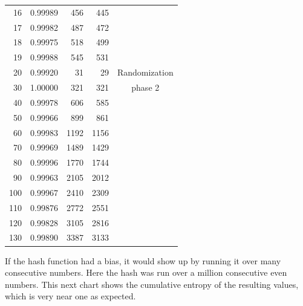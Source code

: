 \documentclass[letterpaper]{article}
\begin{document}
\begin{multicols}{2}
\begin{minipage}{\columnwidth}
\begin{tabular}{|r|r|r|r|c|}
            16                 & 0.99989          & 456           & 445            &                \\
            17                 & 0.99982          & 487           & 472            &                \\
            18                 & 0.99975          & 518           & 499            &                \\
            19                 & 0.99988          & 545           & 531            &                \\
            \hline
            20                 & 0.99920          & 31            & 29             & Randomization       \\
            30                 & 1.00000          & 321           & 321            & phase 2      \\
            40                 & 0.99978          & 606           & 585            &        \\
            50                 & 0.99966          & 899           & 861            &                \\
            60                 & 0.99983          & 1192          & 1156           &                \\
            70                 & 0.99969          & 1489          & 1429           &                \\
            80                 & 0.99996          & 1770          & 1744           &                \\
            90                 & 0.99963          & 2105          & 2012           &                \\
            100                & 0.99967          & 2410          & 2309           &                \\
            110                & 0.99876          & 2772          & 2551           &                \\
            120                & 0.99828          & 3105          & 2816           &                \\
            130                & 0.99890          & 3387          & 3133           &                \\
            \hline
        \end{tabular}
    \end{minipage}

    If the hash function had a bias, it would show up by running it over many consecutive numbers. Here the hash was run over a million consecutive even numbers. This next chart shows the cumulative entropy of the resulting values, which is very near one as expected.


\end{multicols}
\end{document}
